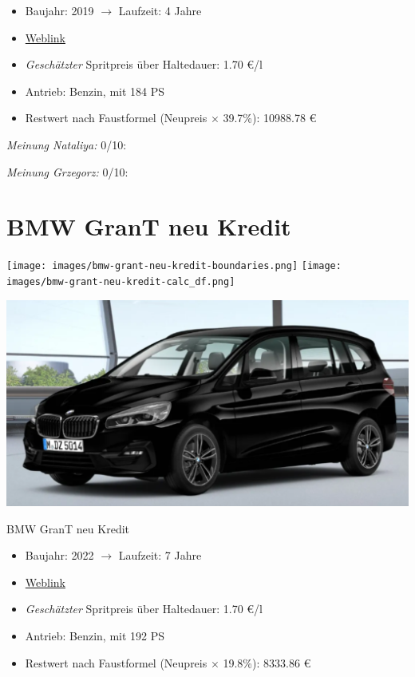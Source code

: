\documentclass[landscape, DIV=99, 14pt]{scrartcl}
\begin{document}
\begin{itemize}
    \item Baujahr: 2019 $\rightarrow$ Laufzeit: 4 Jahre
    \item \href{https://suchen.mobile.de/fahrzeuge/details.html?action=parkItem&id=327113608}{Weblink}
    \item \emph{Gesch\"atzter} Spritpreis \"uber Haltedauer: 1.70 \euro{}/l
    \item Antrieb: Benzin, mit 184 PS
    \item Restwert nach Faustformel (Neupreis $\times$ 39.7\%): 10988.78 \euro{}
\end{itemize}

\begin{small}
\emph{Meinung Nataliya:} 0/10: 
        
\emph{Meinung Grzegorz:} 0/10: 
\end{small}

\pagebreak


\twocolumn

\section*{BMW GranT neu Kredit}
\begin{center}
\texttt{[image: images/bmw-grant-neu-kredit-boundaries.png]}
\null
\vspace{0.5cm}
\texttt{[image: images/bmw-grant-neu-kredit-calc\_df.png]}
\end{center}

\pagebreak
\begin{center}
\includegraphics[width=0.9\columnwidth]{cars/bmw-gran-tourer-mulfinger.png}

BMW GranT neu Kredit
\end{center}

\begin{itemize}
    \item Baujahr: 2022 $\rightarrow$ Laufzeit: 7 Jahre
    \item \href{https://mulfinger.de/de/fahrzeugangebot/BMW/220i-GranTourer-Sport-DKG-HUD-LED-ParkAssNavi/page1/details-p5clkem9?manufacturer=5&model=2534&view=list}{Weblink}
    \item \emph{Gesch\"atzter} Spritpreis \"uber Haltedauer: 1.70 \euro{}/l
    \item Antrieb: Benzin, mit 192 PS
    \item Restwert nach Faustformel (Neupreis $\times$ 19.8\%): 8333.86 \euro{}
\end{itemize}
\end{document}
